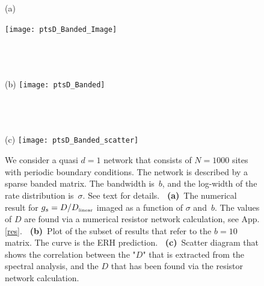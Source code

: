 \documentclass[aps,pre,floats,floatfix,twocolumn]{revtex4}
\newcommand{\tbox}[1]{\mbox{\tiny #1}}
\begin{document}
\begin{figure}[h!]

(a) 

\texttt{[image: ptsD\_Banded\_Image]}

\ \\ \ \\ \ \\ 

(b)  
\texttt{[image: ptsD\_Banded]}

\ \\ \ \\ \ \\ 

(c) 
\texttt{[image: ptsD\_Banded\_scatter]}

\caption{
We consider a quasi $d{=}1$ network that consists 
of ${N=1000}$ sites with periodic boundary conditions. 
The network is described by a sparse banded matrix. 
The bandwidth is~$b$, and the log-width of the rate 
distribution is~$\sigma$. See text for details.
%
{\bf \ (a)}~The numerical result for $g_s=D/D_{\tbox{linear}}$ 
imaged as a function of $\sigma$ and~$b$.
The values of $D$ are found via a numerical 
resistor network calculation, see App.\ref{res}.  
%
{\bf \ (b)}~Plot of the subset of results that 
refer to the $b=10$ matrix. 
The curve is the ERH prediction. 
%
{\bf \ (c)}~Scatter diagram that shows 
the correlation between the "$D$" that is extracted 
from the spectral analysis, and the $D$ that  
has been found via the resistor network calculation.}
\label{f4}
\end{figure}


\clearpage
\end{document}

